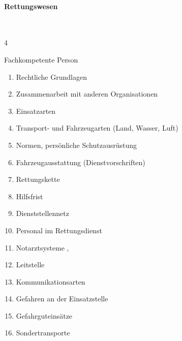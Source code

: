   

\paragraph{Rettungswesen}~
  
  \begin{inparadesc}
    \item[Stundenanzahl:]  4
    \item[Lehrkraft:]   Fachkompetente Person
  \end{inparadesc}
  
  \begin{enumerate}
    \item Rechtliche Grundlagen
    \\
    \item    Zusammenarbeit mit  anderen Organisationen \dotfill  {}
    \item    Einsatzarten \dotfill {}
    \item    Transport- und Fahrzeugarten (Land,  Wasser, Luft) \dotfill {}
    \item    Normen, persönliche Schutzausrüstung \dotfill {}
    \item    Fahrzeugausstattung (Dienstvorschriften) \dotfill {}
    \item    Rettungskette \dotfill {}
    \item    Hilfsfrist \dotfill {}
    \item    Dienststellennetz 
    \item    Personal im Rettungsdienst \dotfill {}
    \item    Notarztsysteme \dotfill {},
    \item    Leitstelle \dotfill {}
    \item    Kommunikationsarten \dotfill {}
    \item    Gefahren an der Einsatzstelle \dotfill {}
    \item    Gefahrguteinsätze \dotfill {}
    \item    Sondertransporte \dotfill {}
    
  \end{enumerate}

